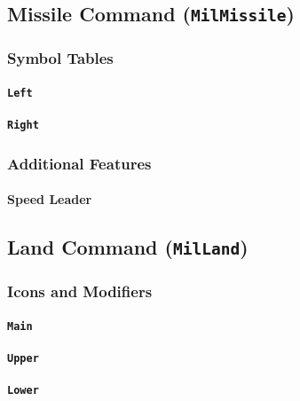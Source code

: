 \documentclass[a4paper, titlepage]{article}
\begin{document}
\subsection{Missile Command (\textbf{\texttt{MilMissile}})}

\subsubsection{Symbol Tables}

\paragraph{\texttt{Left}}
%

\paragraph{\texttt{Right}}
%

\subsubsection{Additional Features}

\paragraph{Speed Leader}

\subsection{Land Command (\textbf{\texttt{MilLand}})}

\subsubsection{Icons and Modifiers}

\paragraph{\texttt{Main}}
%

\paragraph{\texttt{Upper}}
%

\paragraph{\texttt{Lower}}
%
\end{document}
